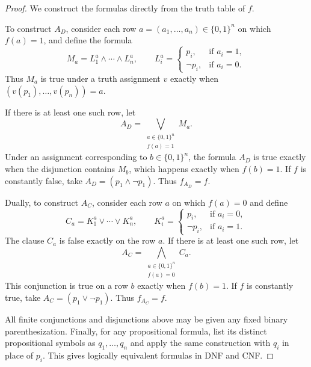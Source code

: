 \documentclass[11pt,a4paper]{amsart}
\begin{document}
\begin{proof}
  We construct the formulas directly from the truth table of \(f\).

  To construct \(A_D\), consider each row
  \(a=(a_1,\ldots,a_n)\in\{0,1\}^n\) on which \(f(a)=1\), and define the
  formula
  \[
    M_a=L_1^a\land\cdots\land L_n^a,
    \qquad
    L_i^a=
    \begin{cases}
      p_i, & \text{if }a_i=1,\\
      \neg p_i, & \text{if }a_i=0.
    \end{cases}
  \]
  Thus \(M_a\) is true under a truth assignment \(v\) exactly when
  \((v(p_1),\ldots,v(p_n))=a\).

  If there is at least one such row, let
  \[
    A_D=\bigvee_{\substack{a\in\{0,1\}^n\\f(a)=1}}M_a.
  \]
  Under an assignment corresponding to \(b\in\{0,1\}^n\), the formula \(A_D\)
  is true exactly when the disjunction contains \(M_b\), which happens exactly
  when \(f(b)=1\). If \(f\) is constantly false, take
  \(A_D=(p_1\land\neg p_1)\). Thus \(f_{A_D}=f\).

  Dually, to construct \(A_C\), consider each row \(a\) on which \(f(a)=0\)
  and define
  \[
    C_a=K_1^a\lor\cdots\lor K_n^a,
    \qquad
    K_i^a=
    \begin{cases}
      p_i, & \text{if }a_i=0,\\
      \neg p_i, & \text{if }a_i=1.
    \end{cases}
  \]
  The clause \(C_a\) is false exactly on the row \(a\). If there is at least
  one such row, let
  \[
    A_C=\bigwedge_{\substack{a\in\{0,1\}^n\\f(a)=0}}C_a.
  \]
  This conjunction is true on a row \(b\) exactly when \(f(b)=1\). If \(f\)
  is constantly true, take \(A_C=(p_1\lor\neg p_1)\). Thus
  \(f_{A_C}=f\).

  All finite conjunctions and disjunctions above may be given any fixed binary
  parenthesization. Finally, for any propositional formula, list its distinct
  propositional symbols as \(q_1,\ldots,q_n\) and apply the same construction
  with \(q_i\) in place of \(p_i\). This gives logically equivalent formulas
  in DNF and CNF.
\end{proof}
\end{document}
